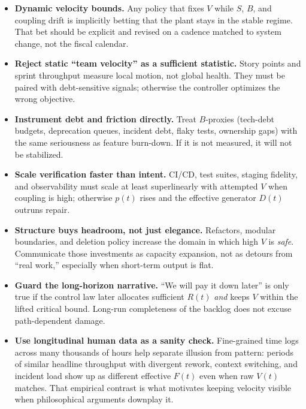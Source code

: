 \documentclass[11pt]{article}
\begin{document}
\begin{itemize}
    \item \textbf{Dynamic velocity bounds.} Any policy that fixes $V$ while $S$, $B$, and coupling drift is implicitly betting that the plant stays in the stable regime. That bet should be explicit and revised on a cadence matched to system change, not the fiscal calendar.

    \item \textbf{Reject static ``team velocity'' as a sufficient statistic.} Story points and sprint throughput measure local motion, not global health. They must be paired with debt-sensitive signals; otherwise the controller optimizes the wrong objective.

    \item \textbf{Instrument debt and friction directly.} Treat $B$-proxies (tech-debt budgets, deprecation queues, incident debt, flaky tests, ownership gaps) with the same seriousness as feature burn-down. If it is not measured, it will not be stabilized.

    \item \textbf{Scale verification faster than intent.} CI/CD, test suites, staging fidelity, and observability must scale at least superlinearly with attempted $V$ when coupling is high; otherwise $p(t)$ rises and the effective generator $D(t)$ outruns repair.

    \item \textbf{Structure buys headroom, not just elegance.} Refactors, modular boundaries, and deletion policy increase the domain in which high $V$ is \emph{safe}. Communicate those investments as capacity expansion, not as detours from ``real work,'' especially when short-term output is flat.

    \item \textbf{Guard the long-horizon narrative.} ``We will pay it down later'' is only true if the control law later allocates sufficient $R(t)$ \emph{and} keeps $V$ within the lifted critical bound. Long-run completeness of the backlog does not excuse path-dependent damage.

    \item \textbf{Use longitudinal human data as a sanity check.} Fine-grained time logs across many thousands of hours help separate illusion from pattern: periods of similar headline throughput with divergent rework, context switching, and incident load show up as different effective $F(t)$ even when raw $V(t)$ matches. That empirical contrast is what motivates keeping velocity visible when philosophical arguments downplay it.
\end{itemize}
\end{document}
